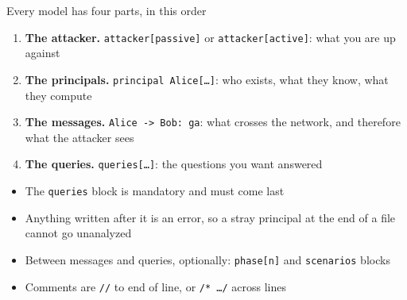 \ifdefined\PRESENTATION\else\PassOptionsToClass{handout}{beamer}\fi\documentclass[aspectratio=169, lualatex]{beamer}
\begin{document}
\begin{frame}{Every model has four parts, in this order}
	\begin{enumerate}
		\item \textbf{The attacker.} \texttt{attacker[passive]} or \texttt{attacker[active]}: what you are up against
		\item \textbf{The principals.} \texttt{principal Alice[\ldots]}: who exists, what they know, what they compute
		\item \textbf{The messages.} \texttt{Alice -> Bob: ga}: what crosses the network, and therefore what the attacker sees
		\item \textbf{The queries.} \texttt{queries[\ldots]}: the questions you want answered
	\end{enumerate}
	\vspace{0.3em}
	\begin{itemize}
		\item The \texttt{queries} block is mandatory and must come last
		\item Anything written after it is an error, so a stray principal at the end of a file cannot go unanalyzed
		\item Between messages and queries, optionally: \texttt{phase[n]} and \texttt{scenarios} blocks
		\item Comments are \texttt{//} to end of line, or \texttt{/* \ldots */} across lines
	\end{itemize}
\end{frame}
\end{document}
